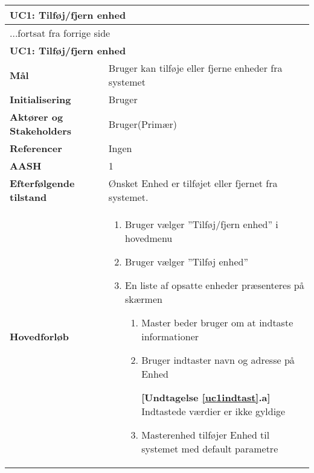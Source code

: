 \begin{center} \centering \label{UC1}
	\begin{longtable}{|p{5cm}|p{9cm}|}  %
	\hline
		\multicolumn{2}{|l|}{\textbf{UC1: Tilføj\slash fjern enhed}} \\\hline %
		\endfirsthead
		
		\multicolumn{2}{l}{...fortsat fra forrige side} \\ \hline %
		\multicolumn{2}{|l|}{\textbf{UC1: Tilføj\slash fjern enhed}} \\\hline %
		\endhead	
		
		\textbf{Mål}								&Bruger kan tilføje eller fjerne enheder fra systemet			\\\hline
		\textbf{Initialisering}					&Bruger														\\\hline
		\textbf{Aktører og Stakeholders}			&Bruger(Primær)												\\\hline 
		\textbf{Referencer}						&Ingen														\\\hline
		\textbf{AASH}							&1															\\\hline
		\textbf{Efterfølgende tilstand}			&Ønsket Enhed er tilføjet eller fjernet fra systemet.		\\\hline
		\textbf{Hovedforløb}					
			&\begin{enumerate}
	
				\item Bruger vælger ''Tilføj/fjern enhed'' i hovedmenu
				
				\item \label{uc1valg} Bruger vælger ''Tilføj enhed''
				
				\item En liste af opsatte enheder præsenteres på skærmen				
				
				\begin{enumerate}
					\item \label{uc1indtast} Master beder bruger om at indtaste informationer
					
					\item \label{uc1indtast_fejl} Bruger indtaster navn og adresse på Enhed
					
						\textbf{[Undtagelse \ref{uc1indtast}.a]} \newline
						Indtastede værdier er ikke gyldige
					
					\item Masterenhed tilføjer Enhed til systemet med default parametre
					

\end{enumerate}
\end{enumerate}
\end{longtable}
\end{center}
